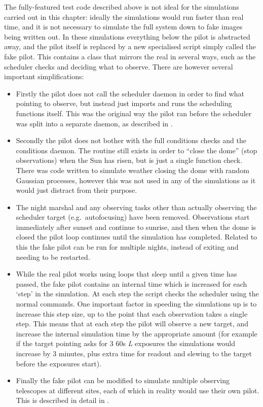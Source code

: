 \begin{colsection}
\begin{colsection}
The fully-featured test code described above is not ideal for the simulations carried out in this chapter: ideally the simulations would run faster than real time, and it is not necessary to simulate the full system down to fake images being written out. In these simulations everything below the pilot is abstracted away, and the pilot itself is replaced by a new specialised script simply called the fake pilot. This contains a class  that mirrors the real  in several ways, such as the scheduler checks and deciding what to observe. There are however several important simplifications:

\begin{itemize}
    \item Firstly the pilot does not call the scheduler daemon in order to find what pointing to observe, but instead just imports and runs the scheduling functions itself. This was the original way the pilot ran before the scheduler was split into a separate daemon, as described in .
    \item Secondly the pilot does not bother with the full conditions checks and the conditions daemon. The  routine still exists in order to ``close the dome'' (stop observations) when the Sun has risen, but is just a single function check. There was code written to simulate weather closing the dome with random Gaussian processes, however this was not used in any of the simulations as it would just distract from their purpose.
    \item The night marshal and any observing tasks other than actually observing the scheduler target (e.g.\ autofocusing) have been removed. Observations start immediately after sunset and continue to sunrise, and then when the dome is closed the pilot loop continues until the simulation has completed. Related to this the fake pilot can be run for multiple nights, instead of exiting and needing to be restarted.
    \item While the real pilot works using loops that sleep until a given time has passed, the fake pilot contains an internal time which is increased for each `step' in the simulation. At each step the script checks the scheduler using the normal commands. One important factor in speeding the simulations up is to increase this step size, up to the point that each observation takes a single step. This means that at each step the pilot will observe a new target, and increase the internal simulation time by the appropriate amount (for example if the target pointing asks for 3 60s \textit{L} exposures the simulations would increase by 3 minutes, plus extra time for readout and slewing to the target before the exposures start).
    \item Finally the fake pilot can be modified to simulate multiple observing telescopes at different sites, each of which in reality would use their own pilot. This is described in detail in .
\end{itemize}


\end{colsection}
\end{colsection}
